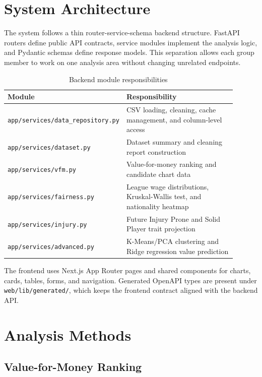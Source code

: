 \documentclass[11pt,a4paper]{article}
\begin{document}
\section{System Architecture}

The system follows a thin router-service-schema backend structure. FastAPI routers define public API contracts, service modules implement the analysis logic, and Pydantic schemas define response models. This separation allows each group member to work on one analysis area without changing unrelated endpoints.

\begin{table}[H]
\centering
\caption{Backend module responsibilities}
\begin{tabular}{p{0.38\linewidth} p{0.52\linewidth}}
\toprule
Module & Responsibility \\
\midrule
\texttt{app/services/data\_repository.py} & CSV loading, cleaning, cache management, and column-level access \\
\texttt{app/services/dataset.py} & Dataset summary and cleaning report construction \\
\texttt{app/services/vfm.py} & Value-for-money ranking and candidate chart data \\
\texttt{app/services/fairness.py} & League wage distributions, Kruskal-Wallis test, and nationality heatmap \\
\texttt{app/services/injury.py} & Future Injury Prone and Solid Player trait projection \\
\texttt{app/services/advanced.py} & K-Means/PCA clustering and Ridge regression value prediction \\
\bottomrule
\end{tabular}
\end{table}

The frontend uses Next.js App Router pages and shared components for charts, cards, tables, forms, and navigation. Generated OpenAPI types are present under \texttt{web/lib/generated/}, which keeps the frontend contract aligned with the backend API.

\section{Analysis Methods}

\subsection{Value-for-Money Ranking}
\end{document}
